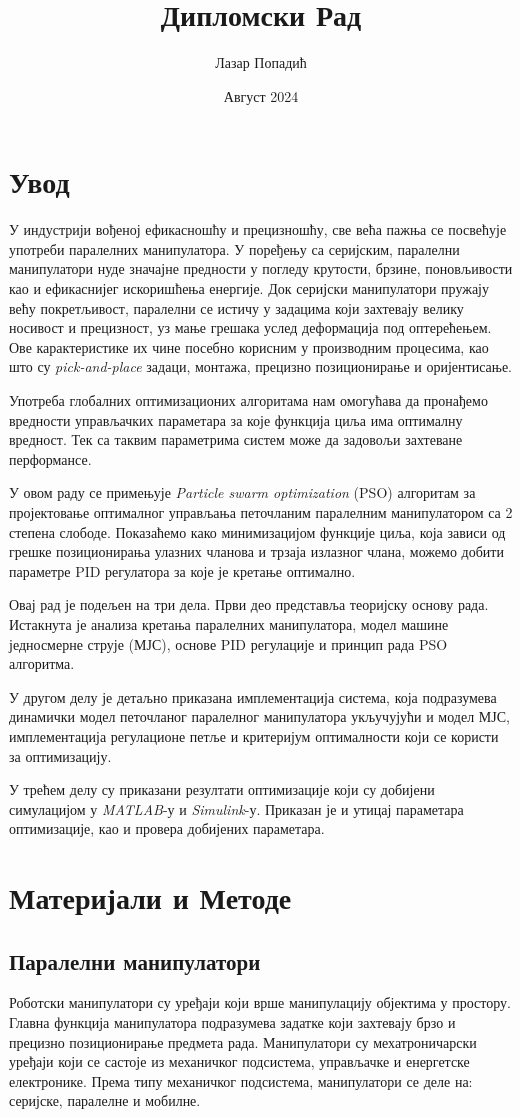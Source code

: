 \documentclass[12pt]{article}
\title{Дипломски Рад}
\author{Лазар Попадић}
\date{Август 2024}
\begin{document}
\tableofcontents
\newpage

\section{Увод}
У индустрији вођеној ефикасношћу и прецизношћу, све већа пажња се посвећује употреби паралелних манипулатора. У поређењу са серијским, паралелни манипулатори нуде значајне предности у погледу крутости, брзине, поновљивости као и ефикаснијег искоришћења енергије. Док серијски манипулатори пружају већу покретљивост, паралелни се истичу у задацима који захтевају велику носивост и прецизност, уз мање грешака услед деформација под оптерећењем. Ове карактеристике их чине посебно корисним у производним процесима, као што су \textit{pick-and-place} задаци, монтажа, прецизно позиционирање и оријентисање.

 Употреба глобалних оптимизационих алгоритама нам омогућава да пронађемо вредности управљачких параметара за које функција циља има оптималну вредност. Тек са таквим параметрима систем може да задовољи захтеване перформансе.

У овом раду се примењује \textit{Particle swarm optimization} (PSO) алгоритам за пројектовање оптималног управљања петочланим паралелним манипулатором са 2 степена слободе. Показаћемо како минимизацијом функције циља, која зависи од грешке позиционирања улазних чланова и трзаја излазног члана, можемо добити параметре PID регулатора за које је кретање оптимално.

Овај рад је подељен на три дела.
Први део представља теоријску основу рада. Истакнута је анализа кретања паралелних манипулатора, модел машине једносмерне струје (МЈС), основе PID регулације и принцип рада PSO алгоритма. 

У другом делу је детаљно приказана имплементација система, која подразумева динамички модел петочланог паралелног манипулатора укључујући и модел МЈС, имплементација регулационе петље и критеријум оптималности који се користи за оптимизацију. 

У трећем делу су приказани резултати оптимизације који су добијени симулацијом у \textit{MATLAB}-у и \textit{Simulink}-у. Приказан је и утицај параметара оптимизације, као и провера добијених параметара.

\newpage
\section{Материјали и Методе}

\subsection{Паралелни манипулатори}
Роботски манипулатори су уређаји који врше манипулацију објектима у простору. Главна функција манипулатора подразумева задатке који захтевају брзо и прецизно позиционирање предмета рада. Манипулатори су мехатроничарски уређаји који се састоје из механичког подсистема, управљачке и енергетске електронике. Према типу механичког подсистема, манипулатори се деле на: серијске, паралелне и мобилне.
\end{document}

